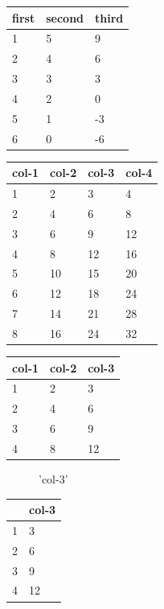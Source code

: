 \documentclass[11pt,a4paper]{article}
\begin{document}
\begin{table}[h]
\begin{tabular}{|l|l|l|}
\hline
first & second & third \\ \hline
1 & 5 & 9 \\ \hline
2 & 4 & 6 \\ \hline
3 & 3 & 3 \\ \hline
4 & 2 & 0 \\ \hline
5 & 1 & -3 \\ \hline
6 & 0 & -6 \\ \hline
\end{tabular}
\end{table}

\begin{table}[h]
\begin{tabular}{|l|l|l|l|}
\hline
col-1 & col-2 & col-3 & col-4 \\ \hline
1 & 2 & 3 & 4 \\ \hline
2 & 4 & 6 & 8 \\ \hline
3 & 6 & 9 & 12 \\ \hline
4 & 8 & 12 & 16 \\ \hline
5 & 10 & 15 & 20 \\ \hline
6 & 12 & 18 & 24 \\ \hline
7 & 14 & 21 & 28 \\ \hline
8 & 16 & 24 & 32 \\ \hline
\end{tabular}
\end{table}

\begin{table}[h]
\begin{tabular}{|l|l|l|}
\hline
col-1 & col-2 & col-3 \\ \hline
1 & 2 & 3 \\ \hline
2 & 4 & 6 \\ \hline
3 & 6 & 9 \\ \hline
4 & 8 & 12 \\ \hline
\end{tabular}
\end{table}

\begin{figure}[h]
\caption{'col-3'}
\end{figure}

\begin{table}[h]
\begin{tabular}{|l|l|}
\hline
 & col-3 \\ \hline
1 & 3 \\ \hline
2 & 6 \\ \hline
3 & 9 \\ \hline
4 & 12 \\ \hline
\end{tabular}
\end{table}
\end{document}
